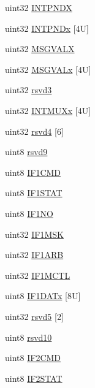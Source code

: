 \begin{DoxyCompactItemize}
\item 
uint32 \mbox{\hyperlink{structcanBase_aa4d4cce2d55570cfa05e9697dc330fd5}{I\+N\+T\+P\+N\+DX}}
\item 
uint32 \mbox{\hyperlink{structcanBase_a880fd16ed2898d4b660878c57e136c50}{I\+N\+T\+P\+N\+Dx}} \mbox{[}4\+U\mbox{]}
\item 
uint32 \mbox{\hyperlink{structcanBase_a57ef58c7d27fe64b66d6a315ccc18712}{M\+S\+G\+V\+A\+LX}}
\item 
uint32 \mbox{\hyperlink{structcanBase_a8aaffd3d8e00ca1c922f6881b2dc9c13}{M\+S\+G\+V\+A\+Lx}} \mbox{[}4\+U\mbox{]}
\item 
uint32 \mbox{\hyperlink{structcanBase_a69048524ce9ea768cbf454115bf854f0}{rsvd3}}
\item 
uint32 \mbox{\hyperlink{structcanBase_a27ac0a91c51b8f665ce7843d5ce0acca}{I\+N\+T\+M\+U\+Xx}} \mbox{[}4\+U\mbox{]}
\item 
uint32 \mbox{\hyperlink{structcanBase_afc02730a3ec690355c2dd52e4f834caa}{rsvd4}} \mbox{[}6\mbox{]}
\item 
uint8 \mbox{\hyperlink{structcanBase_a70e85f20ad79ddd592f6294ecf336d6c}{rsvd9}}
\item 
uint8 \mbox{\hyperlink{structcanBase_ad2fc982cd074b1bfcf4b6c12100bc1b7}{I\+F1\+C\+MD}}
\item 
uint8 \mbox{\hyperlink{structcanBase_aca914dba14cd06680760252b74fc94c5}{I\+F1\+S\+T\+AT}}
\item 
uint8 \mbox{\hyperlink{structcanBase_ac2e6befca4e4435e203ba4fa153c77c3}{I\+F1\+NO}}
\item 
uint32 \mbox{\hyperlink{structcanBase_ade8667cd34fc6007d13e4a32d9c53cfb}{I\+F1\+M\+SK}}
\item 
uint32 \mbox{\hyperlink{structcanBase_a6a9c8a8f208053911833cc8108da90d8}{I\+F1\+A\+RB}}
\item 
uint32 \mbox{\hyperlink{structcanBase_a45411a2628aeb311646530e2611a8abd}{I\+F1\+M\+C\+TL}}
\item 
uint8 \mbox{\hyperlink{structcanBase_aecc56b4ee377adb082966a50f8197e2d}{I\+F1\+D\+A\+Tx}} \mbox{[}8\+U\mbox{]}
\item 
uint32 \mbox{\hyperlink{structcanBase_a8a3526d33ede3672507e2fb80f16aa8b}{rsvd5}} \mbox{[}2\mbox{]}
\item 
uint8 \mbox{\hyperlink{structcanBase_ae4b66bbf5d42e4ae66b5c89ce0285308}{rsvd10}}
\item 
uint8 \mbox{\hyperlink{structcanBase_a258a11bb58abe1f6b01798425094f3ec}{I\+F2\+C\+MD}}
\item 
uint8 \mbox{\hyperlink{structcanBase_a2abe92aa8b21f7e188949856b0558b64}{I\+F2\+S\+T\+AT}}

\end{DoxyCompactItemize}
